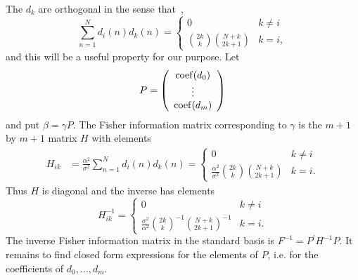 \documentclass[review]{elsarticle}
\begin{document}
The $d_k$ are orthogonal in the sense that~\cite{Eisinberg2007_discerete_otho_poly_equidist},
\[
\sum_{n=1}^{N}{ d_i(n) d_k(n) } = \begin{cases}
0 &  k\neq i \\
\binom{2k}{k} \binom{N+k}{2k+1}  & k = i,
\end{cases}
\]
and this will be a useful property for our purpose.  Let 
\[
P = \left( \begin{array}{c}
\operatorname{coef}(d_0) \\
\vdots \\
\operatorname{coef}(d_m)
\end{array} \right)
\]
and put $\beta = \gamma P$.  The Fisher information matrix corresponding to $\gamma$ is the $m+1$ by $m+1$ matrix $H$ with elements
\begin{align*}
H_{ik} &= \frac{\alpha^2}{\sigma^2}\sum_{n=1}^{N} d_{i}(n) d_{k}(n) 
= \begin{cases}
0 &  k\neq i \\
 \frac{\alpha^2}{\sigma^2} \binom{2k}{k} \binom{N+k}{2k+1}  & k = i.
\end{cases}
\end{align*}
Thus $H$ is diagonal and the inverse has elements
\[
H_{ik}^{-1} = \begin{cases}
0 &  k\neq i \\
 \frac{\sigma^2}{\alpha^2} \binom{2k}{k}^{-1} \binom{N+k}{2k+1}^{-1}  & k = i.
\end{cases}
\] 
The inverse Fisher information matrix in the standard basis is $F^{-1} = P^\prime H^{-1} P$.  It remains to find closed form expressions for the elements of $P$, i.e. for the coefficients of $d_0,\dots,d_m$.  

\newcommand{\stirling}[2]{\genfrac{[}{]}{0pt}{}{#1}{#2}}

\end{document}
